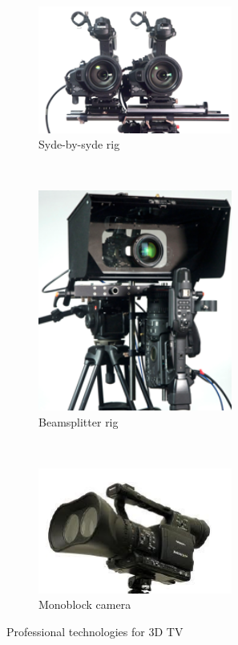 \begin{figure}[h!]
\centering
\begin{subfigure}[]{0.4\textwidth}
\centering
\includegraphics[width=0.7\textwidth]{./img/syderig.png}
\caption{\scriptsize{Syde-by-syde rig}}
\end{subfigure}%
~ %
\begin{subfigure}[]{0.25\textwidth}
\centering
\includegraphics[width=0.7\textwidth]{./img/mirrorrig.png}
\caption{\scriptsize{Beamsplitter rig}}
\end{subfigure} 
~\quad
\begin{subfigure}[]{0.4\textwidth}
\centering
\includegraphics[width=0.7\textwidth]{./img/monorig.png}
\caption{\scriptsize{Monoblock camera}}
\label{disparity}
\end{subfigure}%
\caption{\small{Professional technologies for 3D TV }}
\end{figure}
